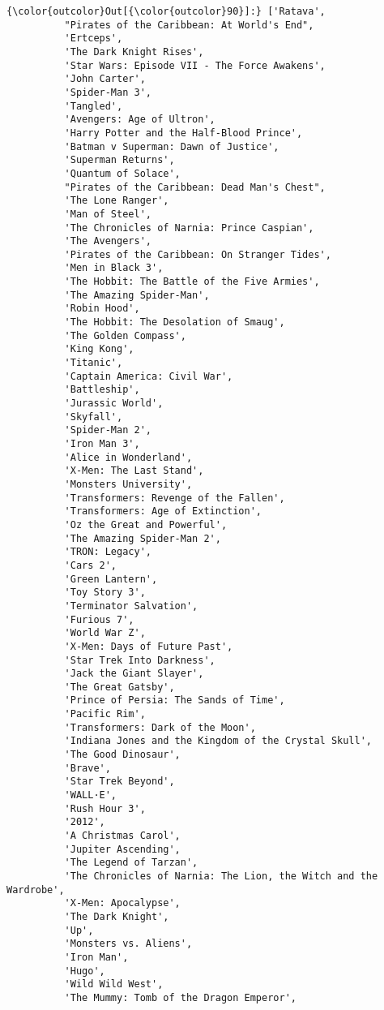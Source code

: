 \documentclass[11pt]{article}
\begin{document}
\begin{Verbatim}[commandchars=\\\{\}]
{\color{outcolor}Out[{\color{outcolor}90}]:} ['Ratava',
          "Pirates of the Caribbean: At World's End",
          'Ertceps',
          'The Dark Knight Rises',
          'Star Wars: Episode VII - The Force Awakens',
          'John Carter',
          'Spider-Man 3',
          'Tangled',
          'Avengers: Age of Ultron',
          'Harry Potter and the Half-Blood Prince',
          'Batman v Superman: Dawn of Justice',
          'Superman Returns',
          'Quantum of Solace',
          "Pirates of the Caribbean: Dead Man's Chest",
          'The Lone Ranger',
          'Man of Steel',
          'The Chronicles of Narnia: Prince Caspian',
          'The Avengers',
          'Pirates of the Caribbean: On Stranger Tides',
          'Men in Black 3',
          'The Hobbit: The Battle of the Five Armies',
          'The Amazing Spider-Man',
          'Robin Hood',
          'The Hobbit: The Desolation of Smaug',
          'The Golden Compass',
          'King Kong',
          'Titanic',
          'Captain America: Civil War',
          'Battleship',
          'Jurassic World',
          'Skyfall',
          'Spider-Man 2',
          'Iron Man 3',
          'Alice in Wonderland',
          'X-Men: The Last Stand',
          'Monsters University',
          'Transformers: Revenge of the Fallen',
          'Transformers: Age of Extinction',
          'Oz the Great and Powerful',
          'The Amazing Spider-Man 2',
          'TRON: Legacy',
          'Cars 2',
          'Green Lantern',
          'Toy Story 3',
          'Terminator Salvation',
          'Furious 7',
          'World War Z',
          'X-Men: Days of Future Past',
          'Star Trek Into Darkness',
          'Jack the Giant Slayer',
          'The Great Gatsby',
          'Prince of Persia: The Sands of Time',
          'Pacific Rim',
          'Transformers: Dark of the Moon',
          'Indiana Jones and the Kingdom of the Crystal Skull',
          'The Good Dinosaur',
          'Brave',
          'Star Trek Beyond',
          'WALL·E',
          'Rush Hour 3',
          '2012',
          'A Christmas Carol',
          'Jupiter Ascending',
          'The Legend of Tarzan',
          'The Chronicles of Narnia: The Lion, the Witch and the Wardrobe',
          'X-Men: Apocalypse',
          'The Dark Knight',
          'Up',
          'Monsters vs. Aliens',
          'Iron Man',
          'Hugo',
          'Wild Wild West',
          'The Mummy: Tomb of the Dragon Emperor',

\end{Verbatim}
\end{document}
